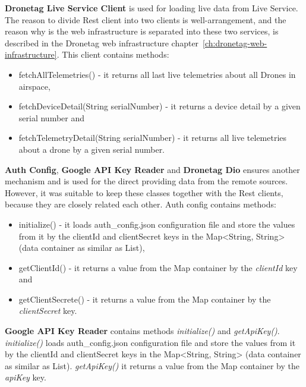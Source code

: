 \textbf{Dronetag Live Service Client} is used for loading live data from Live Service.
The reason to divide Rest client into two clients is well-arrangement, and the reason why is the web infrastructure is separated into these two services, is described in the Dronetag web infrastructure chapter~\ref{ch:dronetag-web-infrastructure}.
This client contains methods:
\begin{itemize}
    \item fetchAllTelemetries() - it returns all last live telemetries about all Drones in airspace,
    \item fetchDeviceDetail(String serialNumber) - it returns a device detail by a given serial number and
    \item fetchTelemetryDetail(String serialNumber) - it returns all live telemetries about a drone by a given serial number.
\end{itemize}

\textbf{Auth Config}, \textbf{Google API Key Reader} and \textbf{Dronetag Dio} ensures another mechanism and is used for the direct providing data from the remote sources.
However, it was suitable to keep these classes together with the Rest clients, because they are closely related each other.
Auth config contains methods:
\begin{itemize}
    \item initialize() - it loads auth\_config.json configuration file and store the values from it by the clientId and clientSecret keys in the Map<String, String> (data container as similar as List),
    \item getClientId() - it returns a value from the Map container by the \textit{clientId} key and
    \item getClientSecrete() - it returns a value from the Map container by the \textit{clientSecret} key.
\end{itemize}
\textbf{Google API Key Reader} contains methods \textit{initialize()} and \textit{getApiKey()}.
\textit{initialize()} loads auth\_config.json configuration file and store the values from it by the clientId and clientSecret keys in the Map<String, String> (data container as similar as List).
\textit{getApiKey()} it returns a value from the Map container by the \textit{apiKey} key.
